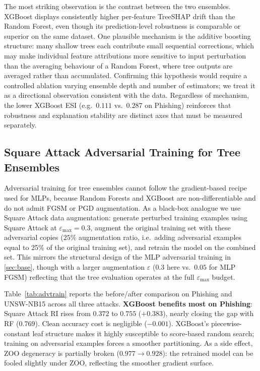 \documentclass[runningheads]{llncs}
\begin{document}
The most striking observation is the contrast between the two ensembles.  XGBoost
displays consistently higher per-feature TreeSHAP drift than the Random Forest,
even though its prediction-level robustness is comparable or superior on the same
dataset.  One plausible mechanism is the additive boosting structure: many shallow trees
each contribute small sequential corrections, which may make individual feature
attributions more sensitive to input perturbation than the averaging behaviour of
a Random Forest, where tree outputs are averaged rather than accumulated.
Confirming this hypothesis would require a controlled ablation varying ensemble
depth and number of estimators; we treat it as a directional observation
consistent with the data.  Regardless of mechanism, the lower XGBoost ESI
(e.g.\ $0.111$ vs.\ $0.287$ on Phishing) reinforces that robustness and
explanation stability are distinct axes that must be measured separately.

\subsection{Square Attack Adversarial Training for Tree Ensembles}
\label{sec:advtrain-trees}

Adversarial training for tree ensembles cannot follow the gradient-based recipe
used for MLPs, because Random Forests and XGBoost are non-differentiable and
do not admit FGSM or PGD augmentation.  As a black-box analogue we use Square
Attack data augmentation: generate perturbed training examples using Square
Attack at $\varepsilon_{\max}=0.3$, augment the original training set with
these adversarial copies ($25\%$ augmentation ratio, i.e.\ adding adversarial
examples equal to 25\% of the original training set), and retrain the model
on the combined set.  This mirrors the structural design of the MLP adversarial
training in \cref{sec:base}, though with a larger augmentation $\varepsilon$
($0.3$ here vs.\ $0.05$ for MLP FGSM) reflecting that the tree evaluation
operates at the full $\varepsilon_{\max}$ budget.

Table~\ref{tab:advtrain} reports the before/after comparison on Phishing and
UNSW-NB15 across all three attacks.  \textbf{XGBoost benefits most on
Phishing}: Square Attack RI rises from $0.372$ to $0.755$ ($+0.383$),
nearly closing the gap with RF ($0.769$).  Clean accuracy cost is negligible
($-0.001$).  XGBoost's piecewise-constant leaf structure makes it highly
susceptible to score-based random search; training on adversarial examples
forces a smoother partitioning.  As a side effect, ZOO degeneracy is partially
broken ($0.977 \to 0.928$): the retrained model can be fooled slightly under
ZOO, reflecting the smoother gradient surface.
\end{document}
